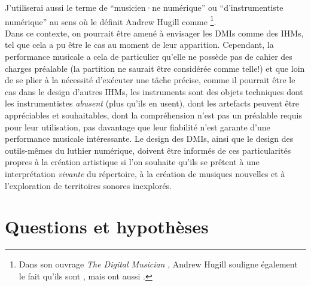 \noindent J'utiliserai aussi le terme de ``musicien·ne numérique'' ou ``d'instrumentiste numérique'' au sens où le définit Andrew Hugill comme \footnote{Dans son ouvrage \textit{The Digital Musician} \cite{hugill_digital_2008}, Andrew Hugill souligne également le fait qu'ils sont , mais ont aussi .}.\\
\indent Dans ce contexte, on pourrait être amené à envisager les \glspl{DMI} comme des \glspl{IHM}, tel que cela a pu être le cas au moment de leur apparition. Cependant, la performance musicale a cela de particulier qu'elle ne possède pas de cahier des charges préalable (la partition ne saurait être considérée comme telle!) et que loin de se plier à la nécessité d'exécuter une tâche précise, comme il pourrait être le cas dans le design d'autres \glspl{IHM}, les instruments sont des objets techniques dont les instrumentistes \textit{abusent} (plus qu'ils en usent), dont les artefacts peuvent être appréciables et souhaitables, dont la compréhension n'est pas un préalable requis pour leur utilisation, pas davantage que leur fiabilité n'est garante d'une performance musicale intéressante. Le design des \glspl{DMI}, ainsi que le design des outils-mêmes du luthier numérique, doivent être informés de ces particularités propres à la création artistique si l'on souhaite qu'ils se prêtent à une interprétation \textit{vivante} du répertoire, à la création de musiques nouvelles et à l'exploration de territoires sonores inexplorés.


\section{Questions et hypothèses}

